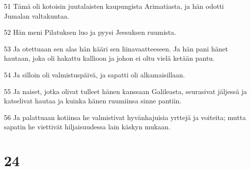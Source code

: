 \par 51 Tämä oli kotoisin juutalaisten kaupungista Arimatiasta, ja hän odotti Jumalan valtakuntaa.
\par 52 Hän meni Pilatuksen luo ja pyysi Jeesuksen ruumista.
\par 53 Ja otettuaan sen alas hän kääri sen liinavaatteeseen. Ja hän pani hänet hautaan, joka oli hakattu kallioon ja johon ei oltu vielä ketään pantu.
\par 54 Ja silloin oli valmistuspäivä, ja sapatti oli alkamaisillaan.
\par 55 Ja naiset, jotka olivat tulleet hänen kanssaan Galileasta, seurasivat jäljessä ja katselivat hautaa ja kuinka hänen ruumiinsa sinne pantiin.
\par 56 Ja palattuaan kotiinsa he valmistivat hyvänhajuisia yrttejä ja voiteita; mutta sapatin he viettivät hiljaisuudessa lain käskyn mukaan.

\chapter{24}

